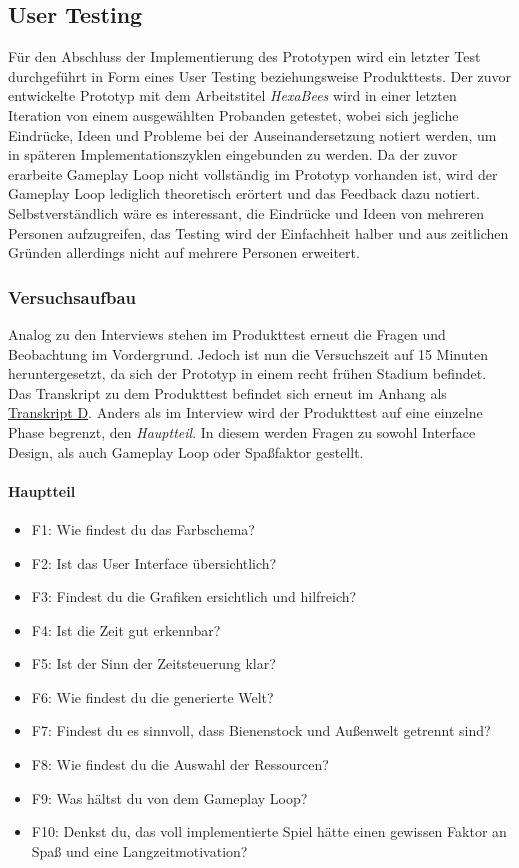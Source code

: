 \subsection{User Testing}
Für den Abschluss der Implementierung des Prototypen wird ein letzter Test durchgeführt in Form eines User Testing beziehungsweise Produkttests. Der zuvor entwickelte Prototyp mit dem Arbeitstitel \textit{HexaBees} wird in einer letzten Iteration von einem ausgewählten Probanden getestet, wobei sich jegliche Eindrücke, Ideen und Probleme bei der Auseinandersetzung notiert werden, um in späteren Implementationszyklen eingebunden zu werden. Da der zuvor erarbeite Gameplay Loop nicht vollständig im Prototyp vorhanden ist, wird der Gameplay Loop lediglich theoretisch erörtert und das Feedback dazu notiert. Selbstverständlich wäre es interessant, die Eindrücke und Ideen von mehreren Personen aufzugreifen, das Testing wird der Einfachheit halber und aus zeitlichen Gründen allerdings nicht auf mehrere Personen erweitert.

\subsubsection{Versuchsaufbau}
Analog zu den Interviews stehen im Produkttest erneut die Fragen und Beobachtung im Vordergrund. Jedoch ist nun die Versuchszeit auf 15 Minuten heruntergesetzt, da sich der Prototyp in einem recht frühen Stadium befindet. Das Transkript zu dem Produkttest befindet sich erneut im Anhang als \hyperref[transcript:D]{Transkript D}. Anders als im Interview wird der Produkttest auf eine einzelne Phase begrenzt, den \textit{Hauptteil}. In diesem werden Fragen zu sowohl Interface Design, als auch Gameplay Loop oder Spaßfaktor gestellt.

\paragraph{Hauptteil}
\begin{itemize}
    \item F1: Wie findest du das Farbschema?
    \item F2: Ist das User Interface übersichtlich?
    \item F3: Findest du die Grafiken ersichtlich und hilfreich?
    \item F4: Ist die Zeit gut erkennbar?
    \item F5: Ist der Sinn der Zeitsteuerung klar?
    \item F6: Wie findest du die generierte Welt?
    \item F7: Findest du es sinnvoll, dass Bienenstock und Außenwelt getrennt sind?
    \item F8: Wie findest du die Auswahl der Ressourcen?
    \item F9: Was hältst du von dem Gameplay Loop?
    \item F10: Denkst du, das voll implementierte Spiel hätte einen gewissen Faktor an Spaß und eine Langzeitmotivation?
\end{itemize}

